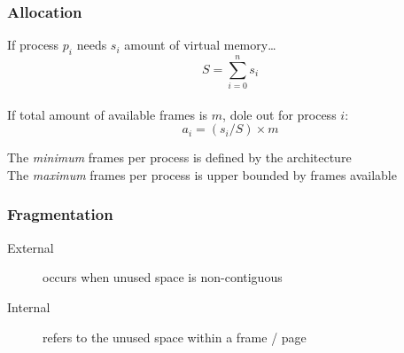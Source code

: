 \documentclass[a4paper]{article}
\begin{document}
\begin{multicols*}{2}
    \vspace*{-3.5em}
    \subsubsection*{Allocation}
    \vspace*{-1.5em}
    \setlength{\columnsep}{1em}
    \begin{multicols*}{2}
        If process \(p_i\) needs \(s_i\) amount of virtual memory\dots
        \begin{equation*}
            S = \sum_{i=0}^{n} s_i
        \end{equation*}
        \columnbreak \\
        If total amount of available frames is \(m\), dole out for process \(i\):
        \begin{equation*}
            a_i = (s_i / S) \times m
        \end{equation*}
    \end{multicols*}

    \vspace*{-2em}
    The \emph{minimum} frames per process is defined by the architecture \\
    The \emph{maximum} frames per process is upper bounded by frames available
    \subsubsection*{Fragmentation}
    \begin{description}
        \item[External] occurs when unused space is non-contiguous
        \item[Internal] refers to the unused space within a frame / page
    \end{description}


\end{multicols*}
\end{document}
